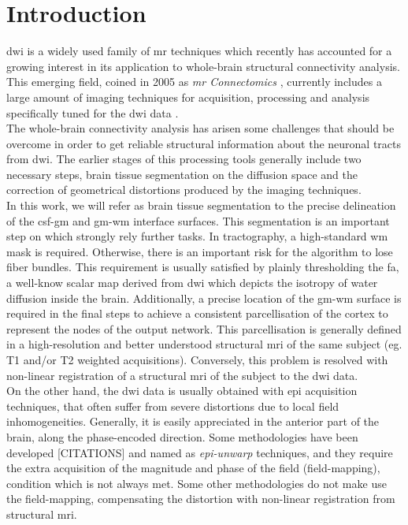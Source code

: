 \section{Introduction}
\label{sec:introduction}
%
\ac{dwi} is a widely used family of \ac{mr} techniques
\citep{sundgren_diffusion_2004} which recently has accounted for a growing
interest in its application to whole-brain structural connectivity analysis.
This emerging field, coined in 2005 as \emph{\ac{mr} Connectomics}
\citep{hagmann_diffusion_2005,sporns_human_2005}, currently includes a
large amount of imaging techniques for acquisition, processing and analysis
specifically tuned for the \ac{dwi} data \citep{hagmann_mr_2012}.\\

The whole-brain connectivity analysis has arisen some challenges
that should be overcome in order to get reliable structural information
about the neuronal tracts from \ac{dwi}. The earlier stages of this
processing tools generally include two necessary steps, brain tissue
segmentation on the diffusion space and the correction of geometrical
distortions produced by the imaging techniques.\\

In this work, we will refer as brain tissue segmentation to the precise
delineation of the \ac{csf}-\ac{gm} and \ac{gm}-\ac{wm} interface surfaces.
This segmentation is an important step on which strongly rely further
tasks. In tractography, a high-standard \ac{wm} mask is required. Otherwise,
there is an important risk for the algorithm to lose fiber bundles. This
requirement is usually satisfied by plainly thresholding the \ac{fa}, a
well-know scalar map derived from \ac{dwi} which depicts the isotropy of
water diffusion inside the brain. Additionally, a precise location of the
\ac{gm}-\ac{wm} surface is required in the final steps to
achieve a consistent parcellisation of the cortex to represent the nodes 
of the output network. This parcellisation is generally defined in a 
high-resolution and better understood structural \ac{mri} of the same 
subject (eg. T1 and/or T2 weighted acquisitions). Conversely, this 
problem is resolved with non-linear registration of a structural \ac{mri}
of the subject to the \ac{dwi} data.\\

On the other hand, the \ac{dwi} data is usually obtained with \ac{epi}
acquisition techniques, that often suffer from severe distortions due to 
local field inhomogeneities. Generally, it is easily appreciated in the anterior
part of the brain, along the phase-encoded direction. Some methodologies have
been developed [CITATIONS] and named as \emph{\ac{epi}-unwarp} techniques,
and they require the extra acquisition of the magnitude and phase of
the field (field-mapping), condition which is not always met. Some other 
methodologies do not make use the field-mapping, compensating the distortion
with non-linear registration from structural \ac{mri}.\\

